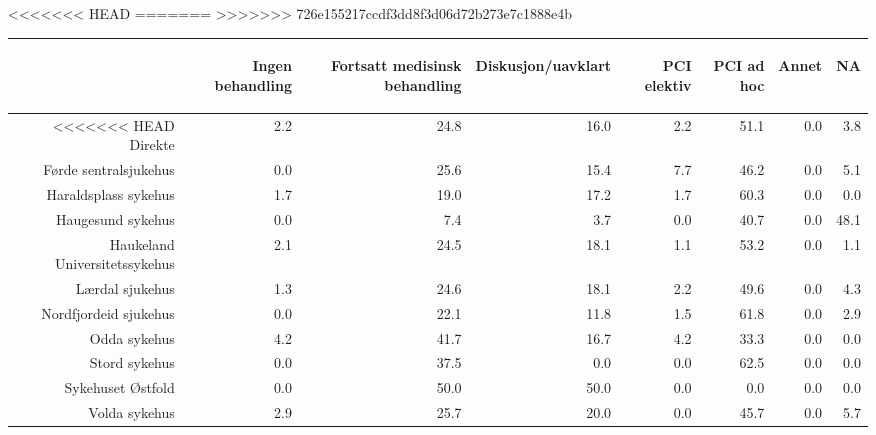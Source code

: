 \documentclass[presentation,xcolor=pdftex,dvipsnames,table]{beamer}
\begin{document}
\begin{frame}
\begin{tiny}
<<<<<<< HEAD
=======
>>>>>>> 726e155217ccdf3dd8f3d06d72b273e7c1888e4b
\begin{table}[ht]
\centering
\begin{tabular}{rrrrrrrr}
  \toprule
 & \begin{sideways} Ingen behandling \end{sideways} & \begin{sideways} Fortsatt medisinsk behandling \end{sideways} & \begin{sideways} Diskusjon/uavklart \end{sideways} & \begin{sideways} PCI elektiv \end{sideways} & \begin{sideways} PCI ad hoc \end{sideways} & \begin{sideways} Annet \end{sideways} & \begin{sideways} NA \end{sideways} \\ 
  \midrule
<<<<<<< HEAD
Direkte & 2.2 & 24.8 & 16.0 & 2.2 & 51.1 & 0.0 & 3.8 \\ 
  Førde sentralsjukehus & 0.0 & 25.6 & 15.4 & 7.7 & 46.2 & 0.0 & 5.1 \\ 
  Haraldsplass sykehus & 1.7 & 19.0 & 17.2 & 1.7 & 60.3 & 0.0 & 0.0 \\ 
  Haugesund sykehus & 0.0 & 7.4 & 3.7 & 0.0 & 40.7 & 0.0 & 48.1 \\ 
  Haukeland Universitetssykehus & 2.1 & 24.5 & 18.1 & 1.1 & 53.2 & 0.0 & 1.1 \\ 
  Lærdal sjukehus & 1.3 & 24.6 & 18.1 & 2.2 & 49.6 & 0.0 & 4.3 \\ 
  Nordfjordeid sjukehus & 0.0 & 22.1 & 11.8 & 1.5 & 61.8 & 0.0 & 2.9 \\ 
  Odda sykehus & 4.2 & 41.7 & 16.7 & 4.2 & 33.3 & 0.0 & 0.0 \\ 
  Stord sykehus & 0.0 & 37.5 & 0.0 & 0.0 & 62.5 & 0.0 & 0.0 \\ 
  Sykehuset Østfold & 0.0 & 50.0 & 50.0 & 0.0 & 0.0 & 0.0 & 0.0 \\ 
  Volda sykehus & 2.9 & 25.7 & 20.0 & 0.0 & 45.7 & 0.0 & 5.7 \\ 

\end{tabular}
\end{table}
\end{tiny}
\end{frame}
\end{document}
